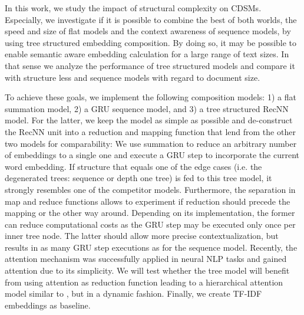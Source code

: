 In this work, we study the impact of structural complexity on \acp{CDSM}. Especially, we investigate if it is possible to combine the best of both worlds, the speed and size of flat models and the context awareness of sequence models, by using tree structured embedding composition. By doing so, it may be possible to enable semantic aware embedding calculation for a large range of text sizes. In that sense we analyze the performance of tree structured models and compare it with structure less and sequence models with regard to document size.


To achieve these goals, we implement the following composition models: 1) a flat summation model, 2) a \ac{GRU} \autocite{cho_properties_2014} sequence model, and 3) a tree structured \ac{RecNN} model. For the latter, we keep the model as simple as possible and de-construct %
the \ac{RecNN} unit into a reduction and mapping function that lend from the other two models for comparability: We use summation to reduce an arbitrary number of embeddings to a single one and execute a \ac{GRU} step to incorporate the current word embedding. If structure that equals one of the edge cases (i.e. the degenerated trees: sequence or depth one tree) is fed to this tree model, it strongly resembles one of the competitor models. Furthermore, the separation in map and reduce functions allows to experiment if reduction should precede the mapping or the other way around. Depending on its implementation, the former can reduce computational costs as the \ac{GRU} step may be executed only once per inner tree node. The latter should allow more precise contextualization, but results in as many \ac{GRU} step executions as for the sequence model. Recently, the attention mechanism \autocite{bahdanau_neural_2014,xu_show_2015} was successfully applied in neural \ac{NLP} tasks \autocite{zhuang_neobility_2017,vaswani_attention_2017} and gained attention due to its simplicity. We will test whether the tree model will benefit from using attention as reduction function leading to a hierarchical attention model similar to \textcite{yang_hierarchical_2016}, but in a dynamic fashion. %
Finally, we create \ac{TF-IDF} embeddings as baseline. 

